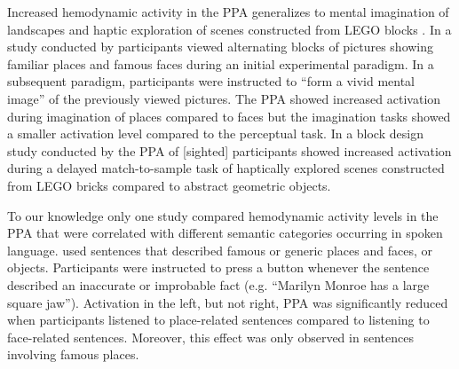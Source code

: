 \documentclass[english]{article}
\begin{document}
Increased hemodynamic activity in the PPA generalizes to mental imagination of
landscapes \citep{ocraven2000mental} and haptic exploration of scenes
constructed from LEGO blocks \citep{wolbers2011modality}.
In a study conducted by \cite{ocraven2000mental} participants viewed alternating
blocks of pictures showing familiar places and famous faces during an initial
experimental paradigm.
In a subsequent paradigm, participants were instructed to ``form a vivid mental
image'' of the previously viewed pictures.
The PPA showed increased activation during imagination of places compared to
faces but the imagination tasks showed a smaller activation level compared to
the perceptual task.
In a block design study conducted by \cite{wolbers2011modality} the PPA of
[sighted] participants showed increased activation during a delayed
match-to-sample task of haptically explored scenes constructed from LEGO bricks
compared to abstract geometric objects.

To our knowledge only one study \citep{aziz2008modulation} compared hemodynamic
activity levels in the PPA that were correlated with different semantic
categories occurring in spoken language.
\cite{aziz2008modulation} used sentences that described famous or generic places
and faces, or objects.
Participants were instructed to press a button whenever the sentence described
an inaccurate or improbable fact (e.g. ``Marilyn Monroe has a large square
jaw'').
Activation in the left, but not right, PPA was significantly reduced when
participants listened to place-related sentences compared to listening to
face-related sentences. Moreover, this effect was only observed in sentences
involving famous places.
\end{document}
